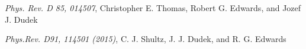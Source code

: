 \documentclass[10pt]{article}
\begin{document}
\newpage
\begin{thebibliography}{9}

     \textit{Phys. Rev. D 85, 014507},         
       Christopher E. Thomas, Robert G. Edwards, and Jozef J. Dudek    

     \textit{Phys.Rev. D91, 114501 (2015)},         
       C. J. Shultz, J. J. Dudek, and R. G. Edwards       


\end{thebibliography}
\end{document}
